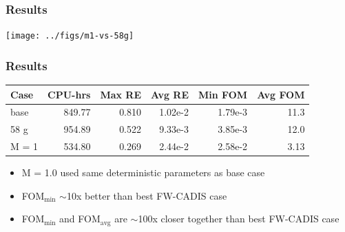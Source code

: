 \documentclass[xcolor=x11names,compress]{beamer}
\renewcommand{\(}{\begin{columns}}
\renewcommand{\)}{\end{columns}}
\newcommand{\<}[1]{\begin{column}{#1}}
\renewcommand{\>}{\end{column}}
\begin{document}
\begin{frame}[fragile]
  \frametitle{Results}
    \begin{center}
  \texttt{[image: ../figs/m1-vs-58g]}  
  \end{center}
\end{frame}


\begin{frame}[fragile]
  \frametitle{Results}

	\begin{table}[p]
 	 \label{tab:comparison}
  	\begin{center}
    \begin{tabular}{|l|r|r|r|r|r|}\hline
      Case & CPU-hrs & Max RE & Avg RE & Min FOM & Avg FOM\\\hline
base & 849.77 & 0.810 & 1.02e-2 & 1.79e-3 & 11.3\\
%
58 g & 954.89 & 0.522 & 9.33e-3 & 3.85e-3 & 12.0\\
%
M = 1 & \alert{534.80} & 0.269 & 2.44e-2 & \alert{2.58e-2} & 3.13\\\hline
    \end{tabular}
 	 \end{center}
	\end{table}

	\begin{itemize}
	\item M = 1.0 used same deterministic parameters as base case
	\item FOM$_{\min}$ $\sim$10x better than best FW-CADIS case
	\item FOM$_{\min}$ and FOM$_{\text{avg}}$ are $\sim$100x closer together than best FW-CADIS case
	\end{itemize}

\end{frame}
\end{document}
